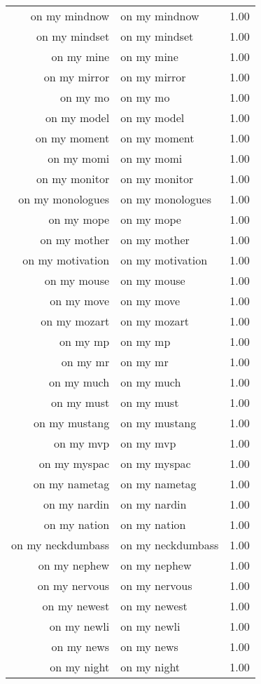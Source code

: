 \begin{table}[ht]
\begin{tabular}{rlr}
  on my mindnow & on my mindnow & 1.00 \\ 
  on my mindset & on my mindset & 1.00 \\ 
  on my mine & on my mine & 1.00 \\ 
  on my mirror & on my mirror & 1.00 \\ 
  on my mo & on my mo & 1.00 \\ 
  on my model & on my model & 1.00 \\ 
  on my moment & on my moment & 1.00 \\ 
  on my momi & on my momi & 1.00 \\ 
  on my monitor & on my monitor & 1.00 \\ 
  on my monologues & on my monologues & 1.00 \\ 
  on my mope & on my mope & 1.00 \\ 
  on my mother & on my mother & 1.00 \\ 
  on my motivation & on my motivation & 1.00 \\ 
  on my mouse & on my mouse & 1.00 \\ 
  on my move & on my move & 1.00 \\ 
  on my mozart & on my mozart & 1.00 \\ 
  on my mp & on my mp & 1.00 \\ 
  on my mr & on my mr & 1.00 \\ 
  on my much & on my much & 1.00 \\ 
  on my must & on my must & 1.00 \\ 
  on my mustang & on my mustang & 1.00 \\ 
  on my mvp & on my mvp & 1.00 \\ 
  on my myspac & on my myspac & 1.00 \\ 
  on my nametag & on my nametag & 1.00 \\ 
  on my nardin & on my nardin & 1.00 \\ 
  on my nation & on my nation & 1.00 \\ 
  on my neckdumbass & on my neckdumbass & 1.00 \\ 
  on my nephew & on my nephew & 1.00 \\ 
  on my nervous & on my nervous & 1.00 \\ 
  on my newest & on my newest & 1.00 \\ 
  on my newli & on my newli & 1.00 \\ 
  on my news & on my news & 1.00 \\ 
  on my night & on my night & 1.00 \\ 

\end{tabular}
\end{table}

